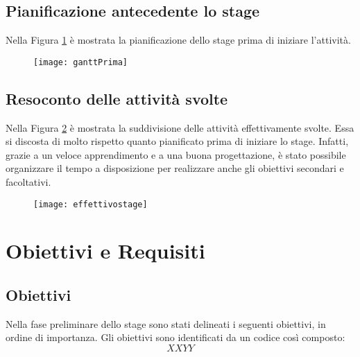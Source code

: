 \subsection{Pianificazione antecedente lo stage}
Nella Figura \ref{primastage} è mostrata la pianificazione dello stage prima di iniziare l'attività.


\begin{figure}[!h]
\centering
    \texttt{[image: ganttPrima]} 
    \label{primastage}
    
\end{figure}

\subsection{Resoconto delle attività svolte}
Nella Figura \ref{dopostage} è mostrata la suddivisione delle attività effettivamente svolte. Essa si discosta di molto rispetto quanto pianificato prima di iniziare lo stage. Infatti, grazie a un veloce apprendimento e a una buona progettazione, è stato possibile organizzare il tempo a disposizione per realizzare anche gli obiettivi secondari e facoltativi.
\\

\begin{figure}[!h]
\centering
    \texttt{[image: effettivostage]} 
    \label{dopostage}
\end{figure}
\newpage

\section{Obiettivi e Requisiti}

\subsection{Obiettivi}
Nella fase preliminare dello stage sono stati delineati i seguenti obiettivi, in ordine di importanza. Gli obiettivi sono identificati da un codice così composto:
$$ XXYY $$

